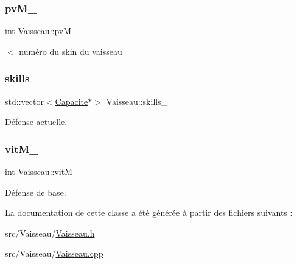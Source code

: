 \subsubsection{\texorpdfstring{pv\+M\+\_\+}{pvM\_}}
{\footnotesize\ttfamily int Vaisseau\+::pv\+M\+\_\+\hspace{0.3cm}{\ttfamily [protected]}}



$<$ numéro du skin du vaisseau 

\mbox{\label{class_vaisseau_a7fccd409e1f27f968bbe3f8ee1ded206}} 
\subsubsection{\texorpdfstring{skills\+\_\+}{skills\_}}
{\footnotesize\ttfamily std\+::vector$<$\hyperlink{class_capacite}{Capacite}$\ast$$>$ Vaisseau\+::skills\+\_\+\hspace{0.3cm}{\ttfamily [protected]}}



Défense actuelle. 

\mbox{\label{class_vaisseau_a7cf3915f4d4044ee28fd5e5633fce11c}} 
\subsubsection{\texorpdfstring{vit\+M\+\_\+}{vitM\_}}
{\footnotesize\ttfamily int Vaisseau\+::vit\+M\+\_\+\hspace{0.3cm}{\ttfamily [protected]}}



Défense de base. 



La documentation de cette classe a été générée à partir des fichiers suivants \+:\begin{DoxyCompactItemize}
\item 
src/\+Vaisseau/\hyperlink{_vaisseau_8h}{Vaisseau.\+h}\item 
src/\+Vaisseau/\hyperlink{_vaisseau_8cpp}{Vaisseau.\+cpp}\end{DoxyCompactItemize}
